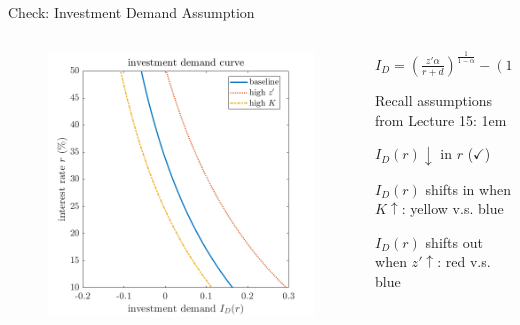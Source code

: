 \documentclass[11pt,aspectratio=43]{beamer}
\let\olditemize=\itemize
\let\endolditemize=\enditemize
\renewenvironment{itemize}{\olditemize \itemsep1em}{\endolditemize}
\theoremstyle{definition}
\begin{document}
\begin{frame}{Check: Investment Demand Assumption}
\label{slide:Check__Investment_Demand_Assumption}
    \begin{columns}
        \begin{column}{0.5\textwidth}
            \begin{figure}
                \includegraphics[width=\textwidth]{./figures/InvestmentDemand.png}
            \end{figure}
        \end{column}
        \begin{column}{0.5\textwidth}
            \begin{center}
                $ \displaystyle
                I_{D} = \left(
                        \frac{z' \alpha}{r+d}
                    \right)^{\frac{1}{1-\alpha}}
                    - ( 1-\delta )K
                $
            \end{center}
            Recall assumptions from Lecture 15:
            \begin{itemize}
                \item $ I_{D}( r ) \downarrow $ in $ r $ ($\checkmark$)
                \item $ I_{D}( r ) $ shifts in when $ K \uparrow $: yellow v.s. blue
                \item $ I_{D}( r ) $ shifts out when $ z' \uparrow  $: red v.s. blue
            \end{itemize}
        \end{column}
    \end{columns}
\end{frame}
\end{document}
